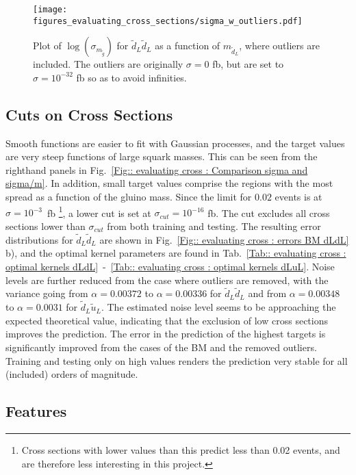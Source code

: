 \documentclass[twoside,english]{uiofysmaster}
\begin{document}
\begin{figure}
\centering
\texttt{[image: figures\_evaluating\_cross\_sections/sigma\_w\_outliers.pdf]}
\caption{Plot of $\log( \sigma_{m_{\tilde{g}}})$ for $\tilde{d}_L \tilde{d}_L$ as a function of $m_{\tilde{d}_L}$, where outliers are included. The outliers are originally $\sigma=0$ fb, but are set to $\sigma =10^{-32}$ fb so as to avoid infinities.}
\label{Fig:: evaluating cross : sigma w outliers}
\end{figure}

\subsection{Cuts on Cross Sections}

Smooth functions are easier to fit with Gaussian processes, and the target values are very steep functions of large squark masses. This can be seen from the righthand panels in Fig.~\ref{Fig:: evaluating cross : Comparison sigma and sigma/m}. In addition, small target values comprise the regions with the most spread as a function of the gluino mass. Since the limit for $0.02$ events is at $\sigma = 10^{-3}$~fb \footnote{Cross sections with lower values than this predict less than 0.02 events, and are therefore less interesting in this project.}, a lower cut is set at $\sigma_{cut} = 10^{-16}$ fb. The cut excludes all cross sections lower than $\sigma_{cut}$ from both training and testing. The resulting error distributions for $\tilde{d}_L \tilde{d}_L$ are shown in Fig.~\ref{Fig:: evaluating cross : errors BM dLdL} b), and the optimal kernel parameters are found in Tab.~\ref{Tab:: evaluating cross : optimal kernels dLdL}~-~\ref{Tab:: evaluating cross : optimal kernels dLuL}. Noise levels are further reduced from the case where outliers are removed, with the variance going from $\alpha=0.00372$ to $\alpha = 0.00336$ for $\tilde{d}_L \tilde{d}_L$ and from $\alpha=0.00348$ to $\alpha=0.0031$ for $\tilde{d}_L \tilde{u}_L$. The estimated noise level seems to be approaching the expected theoretical value, indicating that the exclusion of low cross sections improves the prediction. The error in the prediction of the highest targets is significantly improved from the cases of the BM and the removed outliers. Training and testing only on high values renders the prediction very stable for all (included) orders of magnitude.

\subsection{Features}
\end{document}
